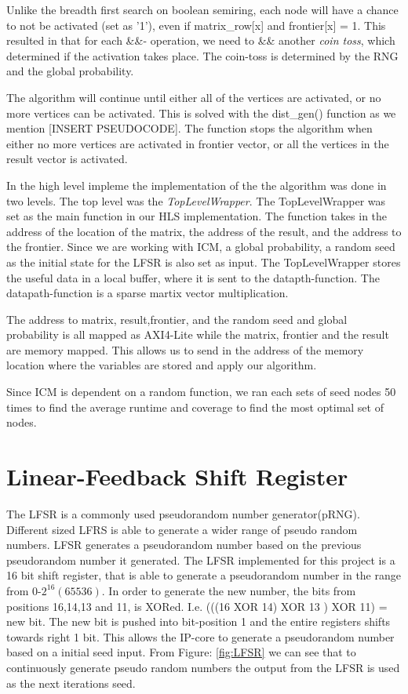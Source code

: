 Unlike the breadth first search on boolean semiring, each node will have a chance to not be activated (set as '1'), even if matrix\_row[x] and frontier[x] = 1. This resulted in that for each \&\&- operation, we need to \&\& another \textit{coin toss}, which determined if the activation takes place. The coin-toss is determined by the RNG and the global probability. 

The algorithm will continue until either all of the vertices are activated, or no more vertices can be activated. This is solved with the dist\_gen() function as we mention [INSERT PSEUDOCODE]. The function stops the algorithm when either no more vertices are activated in frontier vector, or all the vertices in the result vector is activated. 

In the high level impleme the implementation of the the algorithm was done in two levels. The top level was the \textit{TopLevelWrapper}. The TopLevelWrapper was set as the main function in our HLS implementation. The function takes in the address of the location of the matrix, the address of the result, and the address to the frontier. Since we are working with ICM, a global probability, a random seed as the initial state for the LFSR is also set as input. The  TopLevelWrapper stores the useful data in a local buffer, where it is sent to the datapth-function. The datapath-function is a sparse martix vector multiplication. 

The address to matrix, result,frontier, and the random seed and global probability is all mapped as AXI4-Lite while the matrix, frontier and the result are memory mapped. This allows us to send in the address of the memory location where the variables are stored and apply our algorithm. 
 
Since ICM is dependent on a random function, we ran each sets of seed nodes 50 times to find the average runtime and coverage to find the most optimal set of nodes.

\section{Linear-Feedback Shift Register}
The LFSR is a commonly used pseudorandom number generator(pRNG)\citep{murase1992linear}. Different sized LFRS is able to generate a wider range of pseudo random numbers. LFSR generates a pseudorandom number based on the previous pseudorandom number it generated. The LFSR implemented for this project is a 16 bit shift register, that is able to generate a pseudorandom number in the range from 0-$2^{16}(65536)$. In order to generate the new number, the bits from positions 16,14,13 and 11, is XORed. I.e. (((16 XOR 14) XOR 13 ) XOR 11) = new bit. The new bit is pushed into bit-position 1 and the entire registers shifts towards right 1 bit. 
This allows the IP-core to generate a pseudorandom number based on a initial seed input. From Figure: \ref{fig:LFSR} we can see that to continuously generate pseudo random numbers the output from the LFSR is used as the next iterations seed. 

